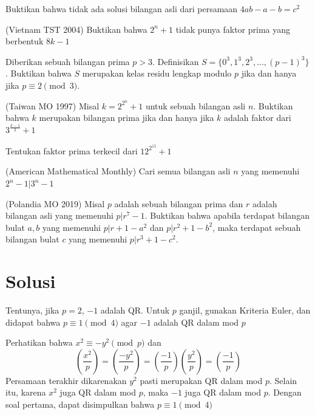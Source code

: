 \documentclass[11pt]{scrartcl}
\begin{document}
\begin{problem}
    Buktikan bahwa tidak ada solusi bilangan asli dari persamaan $4ab - a - b = c^2$
\end{problem}

\begin{problem}
    (Vietnam TST 2004) Buktikan bahwa $2^n + 1$ tidak punya faktor prima yang berbentuk $8k - 1$
\end{problem}

\begin{problem}
    Diberikan sebuah bilangan prima $p > 3$. Definisikan $S = \{0^3, 1^3, 2^3, ..., (p - 1)^3\}$. Buktikan bahwa $S$ merupakan kelas residu lengkap modulo $p$ jika dan hanya jika $p \equiv 2 \pmod{3}$.
\end{problem}

\begin{problem}
    (Taiwan MO 1997) Misal $k = 2^{2^n} + 1$ untuk sebuah bilangan asli $n$. Buktikan bahwa $k$ merupakan bilangan prima jika dan hanya jika $k$ adalah faktor dari $3^{\frac{k - 1}{2}} + 1$
\end{problem}

\begin{problem}
    Tentukan faktor prima terkecil dari $12^{2^{15}} + 1$
\end{problem}

\begin{problem}
    (American Mathematical Monthly) Cari semua bilangan asli $n$ yang memenuhi $2^n - 1|3^n - 1$
\end{problem}

\begin{problem}
    (Polandia MO 2019) Misal $p$ adalah sebuah bilangan prima dan $r$ adalah bilangan asli yang memenuhi $p|r^7 - 1$. Buktikan bahwa apabila terdapat bilangan bulat $a, b$ yang memenuhi $p|r + 1 - a^2$ dan $p|r^2 + 1 - b^2$, maka terdapat sebuah bilangan bulat $c$ yang memenuhi $p|r^3 + 1 - c^2$.
\end{problem}

\newpage
\section{Solusi}
\begin{problem}
    Tentunya, jika $p = 2$, $-1$ adalah QR. Untuk $p$ ganjil, gunakan Kriteria Euler, dan didapat bahwa $p \equiv 1 \pmod{4}$ agar $-1$ adalah QR dalam mod $p$
\end{problem}

\begin{problem}
    Perhatikan bahwa $x^2 \equiv -y^2 \pmod{p}$ dan \[\left(\dfrac{x^2}{p}\right) = \left(\dfrac{-y^2}{p}\right) = \left(\dfrac{-1}{p}\right)\left(\dfrac{y^2}{p}\right) = \left(\dfrac{-1}{p}\right)\]
    Persamaan terakhir dikarenakan $y^2$ pasti merupakan QR dalam mod $p$. Selain itu, karena $x^2$ juga QR dalam mod $p$, maka $-1$ juga QR dalam mod $p$. Dengan soal pertama, dapat disimpulkan bahwa $p \equiv 1 \pmod{4}$
\end{problem}
\end{document}
